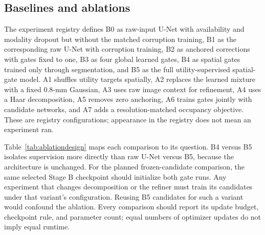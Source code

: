\documentclass[conference]{IEEEtran}
\begin{document}
\subsection{Baselines and ablations}
The experiment registry defines B0 as raw-input U-Net with availability and modality dropout but without the matched corruption training, B1 as the corresponding raw U-Net with corruption training, B2 as anchored corrections with gates fixed to one, B3 as four global learned gates, B4 as spatial gates trained only through segmentation, and B5 as the full utility-supervised spatial-gate model. A1 shuffles utility targets spatially, A2 replaces the learned mixture with a fixed 0.8-mm Gaussian, A3 uses raw image context for refinement, A4 uses a Haar decomposition, A5 removes zero anchoring, A6 trains gates jointly with candidate networks, and A7 adds a resolution-matched occupancy objective. These are registry configurations; appearance in the registry does not mean an experiment ran.

Table~\ref{tab:ablationdesign} maps each comparison to its question. B4 versus B5 isolates supervision more directly than raw U-Net versus B5, because the architecture is unchanged. For the planned frozen-candidate comparison, the same selected Stage B checkpoint should initialize both gate runs. Any experiment that changes decomposition or the refiner must train its candidates under that variant's configuration. Reusing B5 candidates for such a variant would confound the ablation. Every comparison should report its update budget, checkpoint rule, and parameter count; equal numbers of optimizer updates do not imply equal runtime.
\end{document}
